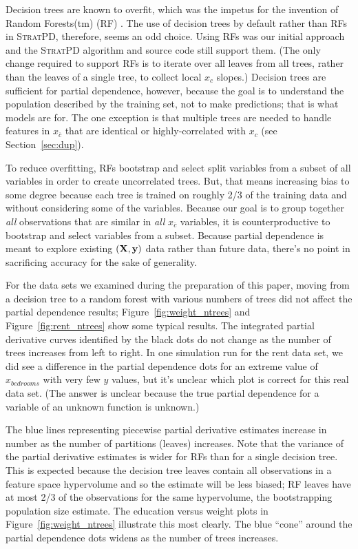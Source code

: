 \documentclass[12pt]{article}
\newcommand{\secref}[1]{Section~\ref{#1}}
\newcommand{\figref}[1]{Figure~\ref{#1}}
\newcommand{\spd}{\fontfamily{cmr}\textsc{\small StratPD}}
\newcommand{\xnc}{$x_{\overline{c}}$}
\begin{document}
Decision trees are known to overfit, which was the impetus for the invention of Random Forests(tm) (RF) \cite{RF}.  The use of decision trees by default rather than RFs in \spd, therefore, seems an odd choice. Using RFs was our initial approach and the \spd{} algorithm and source code still support them. (The only change required to support RFs is to iterate over all leaves from all trees, rather than the leaves of a single tree, to collect local $x_c$ slopes.)  Decision trees are sufficient for partial dependence, however, because the goal is to understand the population described by the training set, not to make predictions; that is what models are for. The one exception is that multiple trees are needed to handle features in \xnc{} that are identical or highly-correlated with $x_c$ (see \secref{sec:dup}).

To reduce overfitting, RFs bootstrap and select split variables from a subset of all variables in order to create uncorrelated trees. But, that means increasing bias to some degree because each tree is trained on roughly 2/3 of the training data and without considering some of the variables. Because our goal is to group together {\em all} observations that are similar in {\em all} \xnc{} variables, it is counterproductive to bootstrap and select variables from a subset. Because partial dependence is meant to explore existing $(\bf X, y)$ data rather than future data, there's no point in sacrificing accuracy for the sake of generality. 

For the data sets we examined during the preparation of this paper, moving from a decision tree to a random forest with various numbers of trees did not affect the partial dependence results; \figref{fig:weight_ntrees} and \figref{fig:rent_ntrees} show some typical results. The integrated partial derivative curves identified by the black dots do not change as the number of trees increases from left to right.  In one simulation run for the rent data set, we did see a difference in the partial dependence dots for an extreme value of $x_{bedrooms}$ with very few $y$ values, but it's unclear which plot is correct for this real data set. (The answer is unclear because the true partial dependence for a variable of an unknown function is unknown.)

The blue lines representing piecewise partial derivative estimates increase in number as the number of partitions (leaves) increases.  Note that the variance of the partial derivative estimates is wider for RFs than for a single decision tree. This is expected because the decision tree leaves contain all observations in a feature space hypervolume and so the estimate will be less biased; RF leaves have at most 2/3 of the observations for the same hypervolume, the bootstrapping population size estimate. The education versus weight plots in \figref{fig:weight_ntrees} illustrate this most clearly. The blue ``cone'' around the partial dependence dots widens as the number of trees increases.  
\end{document}
